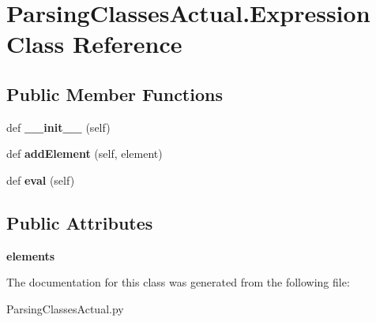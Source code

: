 \hypertarget{class_parsing_classes_actual_1_1_expression}{}\section{Parsing\+Classes\+Actual.\+Expression Class Reference}
\label{class_parsing_classes_actual_1_1_expression}
\subsection*{Public Member Functions}
\begin{DoxyCompactItemize}
\item 
def {\bfseries \+\_\+\+\_\+init\+\_\+\+\_\+} (self)\hypertarget{class_parsing_classes_actual_1_1_expression_a76e27ac0110d45f2943ed2a48b0ec379}{}\label{class_parsing_classes_actual_1_1_expression_a76e27ac0110d45f2943ed2a48b0ec379}

\item 
def {\bfseries add\+Element} (self, element)\hypertarget{class_parsing_classes_actual_1_1_expression_acfc7f3fdfc30916c3684f29994c51e53}{}\label{class_parsing_classes_actual_1_1_expression_acfc7f3fdfc30916c3684f29994c51e53}

\item 
def {\bfseries eval} (self)\hypertarget{class_parsing_classes_actual_1_1_expression_a3a22e0b9d00beb8eb7fa40cfb45db6ed}{}\label{class_parsing_classes_actual_1_1_expression_a3a22e0b9d00beb8eb7fa40cfb45db6ed}

\end{DoxyCompactItemize}
\subsection*{Public Attributes}
\begin{DoxyCompactItemize}
\item 
{\bfseries elements}\hypertarget{class_parsing_classes_actual_1_1_expression_a41891da0f782b121512065f8bbcf7c1b}{}\label{class_parsing_classes_actual_1_1_expression_a41891da0f782b121512065f8bbcf7c1b}

\end{DoxyCompactItemize}


The documentation for this class was generated from the following file\+:\begin{DoxyCompactItemize}
\item 
Parsing\+Classes\+Actual.\+py\end{DoxyCompactItemize}

